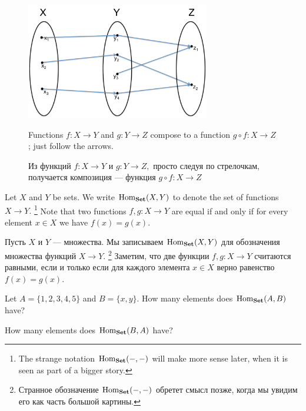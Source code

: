 \documentclass[../main/CT4S-EN-RU]{subfiles}
\begin{document}
\begin{figure}[h]
\begin{center}
\includegraphics[height=2in]{composition}
\end{center}
\begin{blockENG}
\caption{Functions $f\colon X{→} Y$ and $g\colon Y{→} Z$ compose to a function $g\circ f\colon X{→} Z$; just follow the arrows.}
\end{blockENG}
\begin{blockRUS}
\caption{Из функций $f\colon X{→} Y$ и $g\colon Y{→} Z,$ просто следуя по стрелочкам, получается композиция — функция $g\circ f\colon X{→} Z$}
\end{blockRUS}
\end{figure}

\begin{blockENG}
Let $X$ and $Y$ be sets. We write $\operatorname{Hom}_{\mathbf{Set}}(X,Y)$ to denote the set of functions $X{→} Y.$%
\footnote{The strange notation $\operatorname{Hom}_{\mathbf{Set}}(-,-)$ will make more sense later, when it is seen as part of a bigger story.} 
Note that two functions $f,g\colon X{→} Y$ are equal if and only if for every element $x\in X$ we have $f(x)=g(x).$ 
\end{blockENG}

\begin{blockRUS}
Пусть $X$ и $Y$ — множества. Мы записываем $\operatorname{Hom}_{\mathbf{Set}}(X,Y)$ для обозначения множества функций $X{→} Y.$%
\footnote{Странное обозначение $\operatorname{Hom}_{\mathbf{Set}}(-,-)$ обретет смысл позже, когда мы увидим его как часть большой картины.} 
Заметим, что две функции $f,g\colon X{→} Y$ считаются равными, если и только если для каждого элемента $x\in X$ верно равенство $f(x)=g(x).$ 
\end{blockRUS}

\begin{exerciseENG}
Let $A=\{1,2,3,4,5\}$ and $B=\{x,y\}.$ 
\sexc How many elements does $\operatorname{Hom}_{\mathbf{Set}}(A,B)$ have? 
\item How many elements does $\operatorname{Hom}_{\mathbf{Set}}(B,A)$ have?
\endsexc
\end{exerciseENG}
\end{document}

